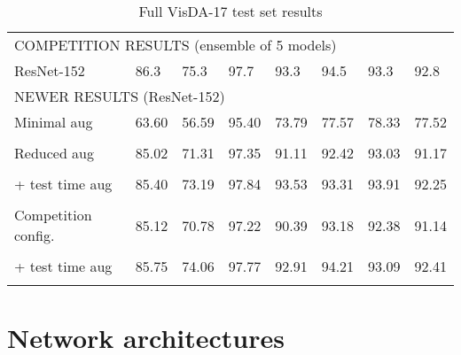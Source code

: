 \documentclass{article}
\begin{document}
\begin{table}[!t]
\begin{center}
\begin{tabular}{llllllll}
\multicolumn{8}{l}{COMPETITION RESULTS (ensemble of 5 models)} \\

\rule{0pt}{2.5ex}ResNet-152       & 86.3      & 75.3      & 97.7      & 93.3      & 94.5      & 93.3      & 92.8 \\

\hline

\multicolumn{8}{l}{NEWER RESULTS (ResNet-152)} \\

\rule{0pt}{2.5ex}Minimal aug        & 63.60     & 56.59     & 95.40     & 73.79     & 77.57     & 78.33     & 77.52     \\
                                    &   &   &   &   &   &   &  \\
                                    
\rule{0pt}{2.5ex}Reduced aug        & 85.02     & 71.31     & 97.35     & 91.11     & 92.42     & 93.03     & 91.17     \\
                                    &   &   &   &   &   &   &  \\
                                    
\rule{0pt}{2.5ex}+ test time aug    & 85.40     & 73.19     & 97.84     & 93.53     & 93.31     & 93.91     & 92.25     \\
                                    &   &   &   &   &   &   &  \\


\rule{0pt}{2.5ex}Competition config.& 85.12     & 70.78     & 97.22     & 90.39     & 93.18     & 92.38     & 91.14     \\
                                    &   &   &   &   &   &   &  \\

\rule{0pt}{2.5ex}+ test time aug    & 85.75     & 74.06     & 97.77     & 92.91     & 94.21     & 93.09     & 92.41     \\
                                    &   &   &   &   &   &   &  \\



\hline
\hline

\end{tabular}

\caption{Full VisDA-17 test set results}
\label{tab:visda_test_full}
\end{center}
\end{table}



\section{Network architectures}
\label{app:architectures}
\end{document}
